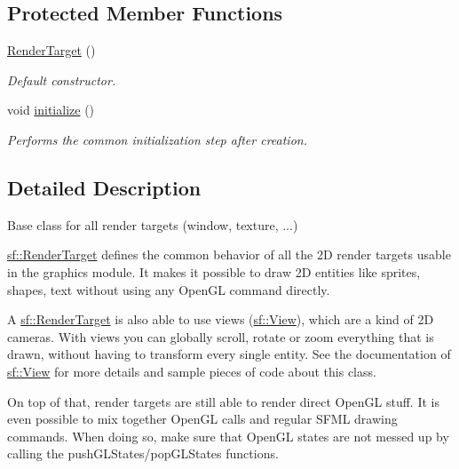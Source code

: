 \subsection*{Protected Member Functions}
\begin{DoxyCompactItemize}
\item 
\mbox{\label{classsf_1_1_render_target_a2997c96cbd93cb8ce0aba2ddae35b86f}} 
\hyperlink{classsf_1_1_render_target_a2997c96cbd93cb8ce0aba2ddae35b86f}{Render\+Target} ()
\begin{DoxyCompactList}\small\item\em Default constructor. \end{DoxyCompactList}\item 
void \hyperlink{classsf_1_1_render_target_af530274b34159d644e509b4b4dc43eb7}{initialize} ()
\begin{DoxyCompactList}\small\item\em Performs the common initialization step after creation. \end{DoxyCompactList}\end{DoxyCompactItemize}


\subsection{Detailed Description}
Base class for all render targets (window, texture, ...) 

\hyperlink{classsf_1_1_render_target}{sf\+::\+Render\+Target} defines the common behavior of all the 2D render targets usable in the graphics module. It makes it possible to draw 2D entities like sprites, shapes, text without using any Open\+GL command directly.

A \hyperlink{classsf_1_1_render_target}{sf\+::\+Render\+Target} is also able to use views (\hyperlink{classsf_1_1_view}{sf\+::\+View}), which are a kind of 2D cameras. With views you can globally scroll, rotate or zoom everything that is drawn, without having to transform every single entity. See the documentation of \hyperlink{classsf_1_1_view}{sf\+::\+View} for more details and sample pieces of code about this class.

On top of that, render targets are still able to render direct Open\+GL stuff. It is even possible to mix together Open\+GL calls and regular S\+F\+ML drawing commands. When doing so, make sure that Open\+GL states are not messed up by calling the push\+G\+L\+States/pop\+G\+L\+States functions.

